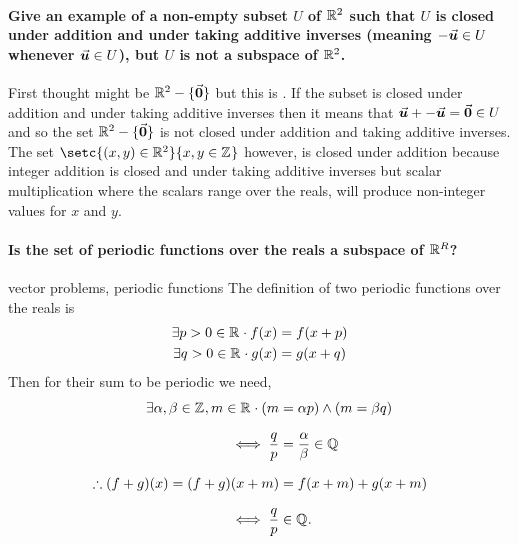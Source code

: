 \documentclass[MathsNotesBase.tex]{subfiles}
\begin{document}
	
	\paragraph{\small{Give an example of a non-empty subset $U$ of $\mathbb{R}^{2}$ such that $U$ is closed under addition and under taking additive inverses (meaning $-\vec{\bm{u}} \in U$ whenever $\vec{\bm{u}} \in U$), but $U$ is not a subspace of $\mathbb{R}^{2}$.}}
	First thought might be $\mathbb{R}^{2} - \{\vec{\bm{0}}\}$ but this is \wrong. If the subset is closed under addition and under taking additive inverses then it means that $\vec{\bm{u}} + -\vec{\bm{u}} = \vec{\bm{0}} \in U$ and so the set $\mathbb{R}^{2} - \{\vec{\bm{0}}\}$ is not closed under addition and taking additive inverses.\\
	The set $\setc{(x,y) \in \R{2}}{x,y \in \Z{}}$ however, is closed under addition because integer addition is closed and under taking additive inverses but scalar multiplication where the scalars range over the reals, will produce non-integer values for $x$ and $y$.

	
	\paragraph{\small{Is the set of periodic functions over the reals a subspace of $\mathbb{R}^{R}$?}}{vector problems, periodic functions}{
	The definition of two periodic functions over the reals is
		\begin{align*}		
		\exists p > 0 \in \mathbb{R}^{} \cdot f(x) &= f(x + p) \\
		\exists q > 0 \in \mathbb{R}^{} \cdot g(x) &= g(x + q) \\
		\end{align*}
	Then for their sum to be periodic we need,
		\begin{align*}
		\exists \alpha, \beta \in \mathbb{Z}^{}, m \in \mathbb{R}^{} \cdot (m &= \alpha{p}) \wedge (m = \beta{q}) \\[7pt]
		\iff \frac{q}{p} &= \frac{\alpha}{\beta} \in \mathbb{Q}^{} \\[7pt]
		\therefore (f + g)(x) = (f + g)(x + m) &= f(x + m) + g(x + m) \\[7pt]
		\iff \frac{q}{p} &\in \mathbb{Q}^{}.
		\end{align*}
	}
\end{document}
